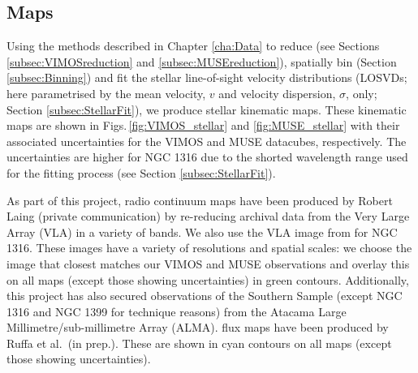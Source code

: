 	\subsection{Maps}
		\label{subsec:maps}
		Using the methods described in Chapter \ref{cha:Data} to reduce (see Sections \ref{subsec:VIMOSreduction} and \ref{subsec:MUSEreduction}), spatially bin (Section \ref{subsec:Binning}) and fit the stellar line-of-sight velocity distributions (LOSVDs; here parametrised by the mean velocity, $v$ and velocity dispersion, $\sigma$, only; Section \ref{subsec:StellarFit}), we produce stellar kinematic maps. These kinematic maps are shown in Figs.\,\ref{fig:VIMOS_stellar} and \ref{fig:MUSE_stellar} with their associated uncertainties for the VIMOS and MUSE datacubes, respectively. The uncertainties are higher for NGC 1316 due to the shorted wavelength range used for the fitting process (see Section \ref{subsec:StellarFit}).

		As part of this project, radio continuum maps have been produced by Robert Laing (private communication) by re-reducing archival data from the Very Large Array (VLA) in a variety of bands. We also use the VLA image from \citet{Lanz2010} for NGC 1316. These images have a variety of resolutions and spatial scales: we choose the image that closest matches our VIMOS and MUSE observations and overlay this on all maps (except those showing uncertainties) in green contours. Additionally, this project has also secured observations of the Southern Sample (except NGC 1316 and NGC 1399 for technique reasons) from the Atacama Large Millimetre/sub-millimetre Array (ALMA).  flux maps have been produced by Ruffa et al.\ (in prep.). These are shown in cyan contours on all maps (except those showing uncertainties). 

